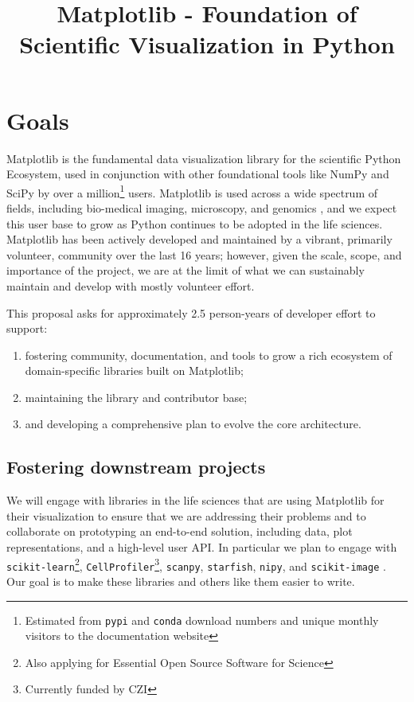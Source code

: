 \documentclass[12pt,letterpaper]{article}  %
\begin{document}
\title{Matplotlib - Foundation of Scientific Visualization in Python}
\author{}
\maketitle

\section{Goals}

Matplotlib\cite{Hunter:2007} is the fundamental
data visualization library for the scientific Python Ecosystem, used
in conjunction with other foundational tools like NumPy and
SciPy \cite{Jones2001} by over a million\footnote{Estimated from \texttt{pypi}
and \texttt{conda} download numbers and unique monthly visitors to the documentation website} users.
Matplotlib is used across a wide spectrum of fields, including bio-medical imaging,
microscopy, and genomics \cite{Carpenter2006,Wolf2018,10.7717/peerj.453,
  Segata2011,10.1371/journal.pgen.1000695,HASHIMSHONY2012666,
  10.1093/bioinformatics/bts480,Carlile2014,Laganowsky2014,Jiangaac9462,
  10.3389/fninf.2014.00014}, and we expect this user base to grow as Python
  continues to be adopted in the life sciences. %
Matplotlib has been actively developed and maintained by a vibrant,
primarily volunteer, community over the last 16 years; however, given
the scale, scope, and importance of the project, we are at the limit
of what we can sustainably maintain and develop with mostly
volunteer effort.

This proposal asks for approximately 2.5 person-years of developer effort to support:

\begin{enumerate}[label=\alph*),noitemsep]
  \item fostering community, documentation, and tools to grow a rich ecosystem of domain-specific libraries built on Matplotlib;
  \item maintaining the library and contributor base;
  \item and developing a comprehensive plan to evolve the core architecture.
\end{enumerate}

\subsection{Fostering downstream projects}
\label{sec:downstream}
We will engage with libraries in the life sciences that are using
Matplotlib for their visualization to ensure that we are addressing
their problems and to collaborate on prototyping an end-to-end
solution, including data, plot representations, and a high-level user
API.  In particular we plan to engage with
\texttt{scikit-learn}\footnote{Also applying for Essential Open Source
Software for Science}, \texttt{CellProfiler}\footnote{Currently funded
by CZI\label{f:czi}}, \texttt{scanpy},
\texttt{starfish}, \texttt{nipy}, and
\texttt{scikit-image}
\cite{10.7717/peerj.453,Carpenter2006, Wolf2018}.
Our goal is to make these libraries and others like them easier to
write.
\end{document}
